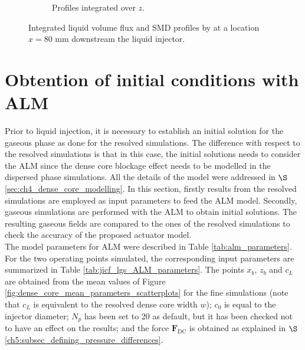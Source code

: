 \begin{figure}[h!]
\begin{subfigure}[b]{0.45\textwidth}
   \caption{Profiles integrated over $z$.}
  \label{fig:integrated_results_Becker_expe_results_over_z}
\end{subfigure}
\caption[{Integrated liquid volume flux and SMD profiles by  at a location $x = 80$ mm downstream the liquid injector.}]{Integrated liquid volume flux and SMD profiles by  at a location $x = 80$ mm downstream the liquid injector. }
\label{fig:integrated_results_Becker_expe_results}
\end{figure}

\section{Obtention of initial conditions with ALM}

Prior to liquid injection, it is necessary to establish an initial solution for the gaseous phase as done for the resolved simulations. The difference with respect to the resolved simulations is that in this case, the initial solutions needs to consider the ALM since the dense core blockage effect needs to be modelled in the dispersed phase simulations. All the details of the model were addressed in $\S$\ref{sec:ch4_dense_core_modelling}. In this section, firstly results from the resolved simulations are employed as input parameters to feed the ALM model. Secondly, gaseous simulations are performed with the ALM to obtain initial solutions. The resulting gaseous fields are compared to the ones of the resolved simulations to check the accuracy of the proposed actuator model. \\


The model parameters for ALM were described in Table \ref{tab:alm_parameters}. For the two operating points simulated, the corresponding input parameters are summarized in Table \ref{tab:jicf_lgs_ALM_parameters}. The points $x_b$, $z_b$ and $c_L$ are obtained from the mean values of Figure \ref{fig:dense_core_mean_parameters_scatterplots} for the fine simulations (note that $c_L$ is equivalent to the resolved dense core width $w$); $c_0$ is equal to the injector diameter; $N_p$ has been set to 20 as default, but it has been checked not to have an effect on the results; and the force $\textbf{F}_\mathrm{DC}$ is obtained as explained in $\S$\ref{ch5:subsec_defining_pressure_differences}.

